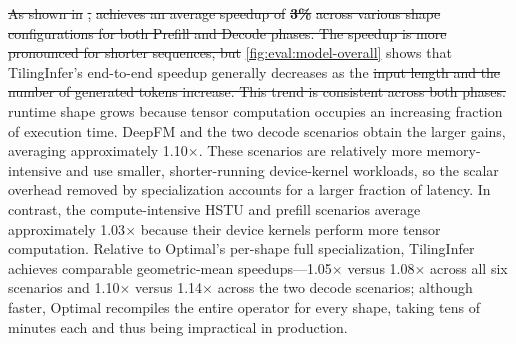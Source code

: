 \documentclass[manuscript,screen,review]{acmart}
\theoremstyle{indenteditalic}
\providecommand{\DIFaddtex}[1]{{\protect\color{blue}#1}} %
\providecommand{\DIFidentity}[1]{#1}
\providecommand{\DIFdeltex}[1]{{%
  \protect\color{red}%
  \normalfont\normalsize
  \let\textbf\DIFidentity
  \let\textit\DIFidentity
  \let\texttt\DIFidentity
  \let\textsc\DIFidentity
  \let\textsf\DIFidentity
  \let\emph\DIFidentity
  \let\uline\DIFidentity
  \sout{#1}%
}} %
\providecommand{\DIFaddbegin}{} %
\providecommand{\DIFaddend}{} %
\providecommand{\DIFdelbegin}{} %
\providecommand{\DIFdelend}{} %
\providecommand{\DIFadd}[1]{\texorpdfstring{\DIFaddtex{#1}}{#1}} %
\providecommand{\DIFdel}[1]{\texorpdfstring{\DIFdeltex{#1}}{}} %
\begin{document}
\DIFdelbegin \DIFdel{As shown in }%
\DIFdel{, }\textbf{%
} %
\DIFdel{achieves an average speedup of }\textbf{\DIFdel{3\%}} %
\DIFdel{across various shape configurations for both Prefill and Decode phases.
The speedup is more pronounced for shorter sequences, but }\DIFdelend \DIFaddbegin \autoref{fig:eval:model-overall} \DIFadd{shows that }TilingInfer\DIFadd{'s end-to-end speedup generally }\DIFaddend decreases as the \DIFdelbegin \DIFdel{input length and the number of generated tokens increase.
This trend is consistent across both phases. }\DIFdelend \DIFaddbegin \DIFadd{runtime shape grows because tensor computation occupies an increasing fraction of execution time. DeepFM and the two decode scenarios obtain the larger gains, averaging approximately 1.10$\times$. These scenarios are relatively more memory-intensive and use smaller, shorter-running device-kernel workloads, so the scalar overhead removed by specialization accounts for a larger fraction of latency. In contrast, the compute-intensive HSTU and prefill scenarios average approximately 1.03$\times$ because their device kernels perform more tensor computation. Relative to Optimal's per-shape full specialization, }TilingInfer \DIFadd{achieves comparable geometric-mean speedups---1.05$\times$ versus 1.08$\times$ across all six scenarios and 1.10$\times$ versus 1.14$\times$ across the two decode scenarios; although faster, Optimal recompiles the entire operator for every shape, taking tens of minutes each and thus being impractical in production.
}\DIFaddend 
\end{document}
